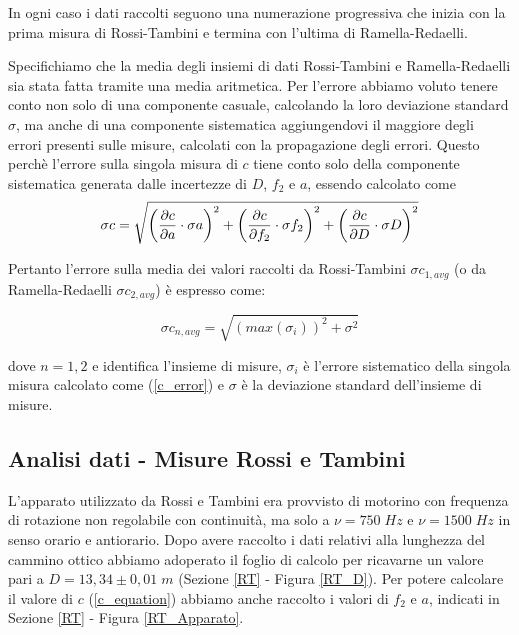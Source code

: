 \documentclass{article}
\begin{document}
In ogni caso i dati raccolti seguono una numerazione progressiva che inizia con la prima misura di Rossi-Tambini e termina con l'ultima di Ramella-Redaelli.

Specifichiamo che la media degli insiemi di dati Rossi-Tambini e Ramella-Redaelli sia stata fatta tramite una media aritmetica. Per l'errore
abbiamo voluto tenere conto non solo di una componente casuale, calcolando la loro deviazione standard $\sigma$, ma anche di una componente sistematica aggiungendovi
il maggiore degli errori presenti sulle misure, calcolati con la propagazione degli errori.
Questo perchè l'errore sulla singola misura di $c$ tiene conto solo della componente sistematica generata dalle incertezze di $D$, $f_2$ e $a$, essendo calcolato come
\begin{equation}
    \centering
    \sigma c = \sqrt{\bigg(\frac{\partial c}{\partial a}\cdot \sigma a\bigg)^2 + \bigg(\frac{\partial c}{\partial f_2}\cdot \sigma f_2 \bigg)^2 + \bigg(\frac{\partial c}{\partial D}\cdot \sigma D \bigg)^2} 
    \label{c_error}
\end{equation}

Pertanto l'errore sulla media dei valori raccolti da Rossi-Tambini $\sigma c_{1,avg}$ (o da Ramella-Redaelli $\sigma c_{2,avg}$) è espresso come:

\begin{equation}
    \sigma c_{n,avg} =\sqrt{(max(\sigma_{i}))^2+\sigma^2}
    \label{c_Errore}
\end{equation}

dove $n=1,2$ e identifica l'insieme di misure, $\sigma_{i}$ è l'errore sistematico della singola misura calcolato come (\ref{c_error}) e $\sigma$ è la deviazione standard dell'insieme di misure.



\subsection{Analisi dati - Misure Rossi e Tambini} \label{DataAnalysis_RT}

L'apparato utilizzato da Rossi e Tambini era provvisto di motorino con frequenza di rotazione non regolabile con continuità, ma solo a $\nu=750 \; Hz$ e $\nu=1500 \; Hz$
in senso orario e antiorario. Dopo avere raccolto i dati relativi alla lunghezza del cammino ottico abbiamo adoperato il foglio di calcolo per ricavarne un valore pari 
a $D = 13,34 \pm 0,01 \; m$ (Sezione \ref{RT} - Figura \ref{RT_D}). Per potere calcolare il valore di $c$ (\ref{c_equation}) abbiamo anche raccolto i valori di $f_2$ e $a$,
indicati in Sezione \ref{RT} - Figura \ref{RT_Apparato}.
\end{document}

